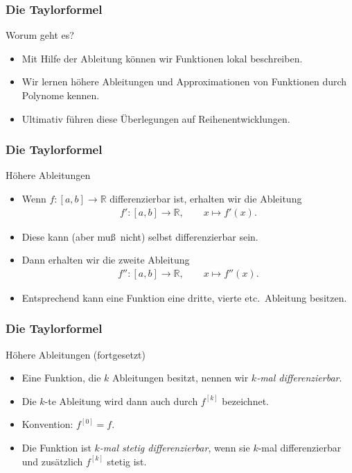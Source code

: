 \documentclass{beamer}
\title[Annuma]{\mytitle}
\author[Amin Coja-Oghlan]{Amin Coja-Oghlan}
\institute[Frankfurt]{JWGUFFM}
\date{}
\renewcommand{\emph}[1]{{\textcolor{solarizedRed}{\itshape #1}}}
\newcommand\RR{\mathbb R}
\renewcommand{\ae}{\"a}
\renewcommand{\oe}{\"o}
\newcommand{\ue}{\"u}
\newcommand{\Ue}{\"U}
\newcommand{\mytitle}{Die Taylorformel}
\begin{document}
\frame[plain]{\titlepage}

\begin{frame}\frametitle{\mytitle}
	\begin{block}{Worum geht es?}
		\begin{itemize}
			\item Mit Hilfe der Ableitung k\oe nnen wir Funktionen lokal beschreiben.
			\item Wir lernen h\oe here Ableitungen und Approximationen von Funktionen durch Polynome kennen.
			\item Ultimativ f\ue hren diese \Ue berlegungen auf Reihenentwicklungen.
		\end{itemize}
	\end{block}
\end{frame}

\begin{frame}\frametitle{\mytitle}
	\begin{block}{H\oe here Ableitungen}
		\begin{itemize}
			\item Wenn $f:[a,b]\to\RR$ differenzierbar ist, erhalten wir die Ableitung
				\begin{align*}
					f':[a,b]\to\RR,\qquad x\mapsto f'(x).
				\end{align*}
			\item Diese kann (aber mu\ss\ nicht) selbst differenzierbar sein.
			\item Dann erhalten wir die zweite Ableitung
				\begin{align*}
					f'':[a,b]\to\RR,\qquad x\mapsto f''(x).
				\end{align*}
			\item Entsprechend kann eine Funktion eine dritte, vierte etc.\ Ableitung besitzen.
		\end{itemize}
	\end{block}
\end{frame}

\begin{frame}\frametitle{\mytitle}
	\begin{block}{H\oe here Ableitungen (fortgesetzt)}
		\begin{itemize}
			\item Eine Funktion, die $k$ Ableitungen besitzt, nennen wir \emph{$k$-mal differenzierbar}.
			\item Die $k$-te Ableitung wird dann auch durch $f^{[k]}$ bezeichnet.
			\item \alert{Konvention:} $f^{[0]}=f$.
			\item Die Funktion ist \emph{$k$-mal stetig differenzierbar}, wenn sie $k$-mal differenzierbar und zus\ae tzlich $f^{[k]}$ stetig ist.
		\end{itemize}
	\end{block}
\end{frame}
\end{document}
